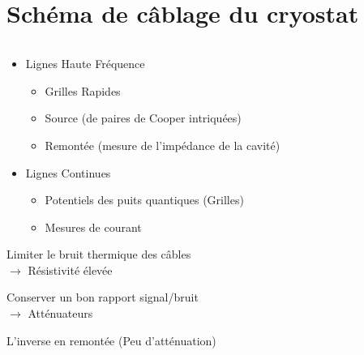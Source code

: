 \documentclass[8pt,a9paper]{beamer} \usepackage[utf8]{inputenc} \usepackage[francais]{babel} \usepackage[T1]{fontenc}
\begin{document}
\section{Schéma de câblage du cryostat}
\begin{frame}
    \begin{columns}[T]
    \begin{column}{0.6\textwidth}
    \begin{itemize}
        \item Lignes Haute Fréquence
        \begin{itemize}
            \item Grilles Rapides
            \item Source (de paires de Cooper intriquées)
            \item Remontée (mesure de l'impédance de la cavité)
        \end{itemize}
        \vspace{2mm}
        \item Lignes Continues
        \begin{itemize}
            \item Potentiels des puits quantiques (Grilles)
            \item Mesures de courant
        \end{itemize}
    \end{itemize}
    \vspace{5mm}
    
    Limiter le bruit thermique des câbles \\\qquad$\rightarrow$ Résistivité élevée
    \vspace{5mm}

    Conserver un bon rapport signal/bruit \\\qquad$\rightarrow$ Atténuateurs
    
    \vspace{5mm}
    L'inverse en remontée (Peu d'atténuation)



\end{column}
\end{columns}
\end{frame}
\end{document}
